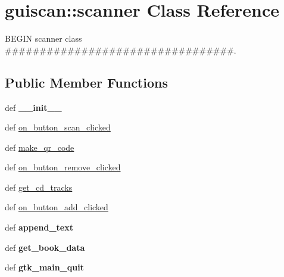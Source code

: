 \hypertarget{classguiscan_1_1scanner}{
\section{guiscan::scanner Class Reference}
\label{classguiscan_1_1scanner}
}


BEGIN scanner class \#\#\#\#\#\#\#\#\#\#\#\#\#\#\#\#\#\#\#\#\#\#\#\#\#\#\#\#\#\#\#\#\#.  


\subsection*{Public Member Functions}
\begin{DoxyCompactItemize}
\item 
\hypertarget{classguiscan_1_1scanner_a24bf6dd8edd117579f128998757654a0}{
def {\bfseries \_\-\_\-init\_\-\_\-}}
\label{classguiscan_1_1scanner_a24bf6dd8edd117579f128998757654a0}

\item 
def \hyperlink{classguiscan_1_1scanner_a3985b7e8a7c583f1855ffefb09f614dd}{on\_\-button\_\-scan\_\-clicked}
\item 
def \hyperlink{classguiscan_1_1scanner_a99a34b9d6414b7e32662581b02a703a2}{make\_\-qr\_\-code}
\item 
def \hyperlink{classguiscan_1_1scanner_aed3d81af22db6558f5039b08209667cb}{on\_\-button\_\-remove\_\-clicked}
\item 
def \hyperlink{classguiscan_1_1scanner_add6ce80a7c6564e35bd607212c477ec2}{get\_\-cd\_\-tracks}
\item 
def \hyperlink{classguiscan_1_1scanner_af48fc927b531df3991648cbca7ba715a}{on\_\-button\_\-add\_\-clicked}
\item 
\hypertarget{classguiscan_1_1scanner_ac7fb4a3b65f7f4cb165dd5700d31c128}{
def {\bfseries append\_\-text}}
\label{classguiscan_1_1scanner_ac7fb4a3b65f7f4cb165dd5700d31c128}

\item 
\hypertarget{classguiscan_1_1scanner_a01865857f839cf3e5bcd8f8b74bd418e}{
def {\bfseries get\_\-book\_\-data}}
\label{classguiscan_1_1scanner_a01865857f839cf3e5bcd8f8b74bd418e}

\item 
\hypertarget{classguiscan_1_1scanner_af8dad2898aba6607bf75b6a5fcf18249}{
def {\bfseries gtk\_\-main\_\-quit}}
\label{classguiscan_1_1scanner_af8dad2898aba6607bf75b6a5fcf18249}

\end{DoxyCompactItemize}
